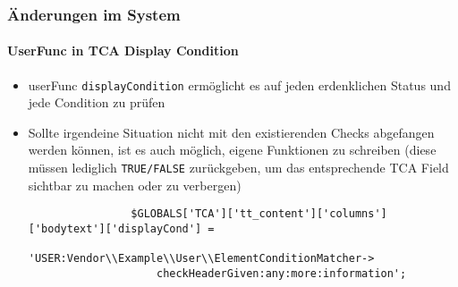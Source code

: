 \begin{frame}[fragile]
	\frametitle{Änderungen im System}
	\framesubtitle{UserFunc in TCA Display Condition}

	\begin{itemize}
		\item userFunc \texttt{displayCondition} ermöglicht es auf jeden erdenklichen Status und jede Condition zu prüfen
		\item Sollte irgendeine Situation nicht mit den existierenden Checks abgefangen werden können,
			ist es auch möglich, eigene Funktionen zu schreiben (diese müssen
			lediglich \texttt{TRUE/FALSE} zurückgeben, um das entsprechende
			TCA Field sichtbar zu machen oder zu verbergen)

			\begin{lstlisting}
				$GLOBALS['TCA']['tt_content']['columns']['bodytext']['displayCond'] =
				  'USER:Vendor\\Example\\User\\ElementConditionMatcher->
				    checkHeaderGiven:any:more:information';
			\end{lstlisting}

	\end{itemize}

\end{frame}


